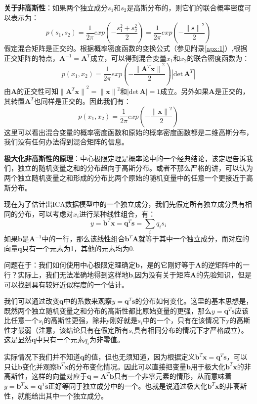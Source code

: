 \textbf{关于非高斯性}：如果两个独立成分$s_1$和$s_2$是高斯分布的，则它们的联合概率密度可以表示为：
\begin{equation}
p(s_1,s_2)
=\frac{1}{2\pi}exp(-\frac{s_1^2+s_2^2}{2})
=\frac{1}{2\pi}exp(-\frac{{\lVert \mathbf{s} \rVert}^2}{2})
\end{equation}
假定混合矩阵是正交的。根据概率密度函数的变换公式（参见附录\ref{apx:1}）,根据正交矩阵的特点，$\textbf{A}^{-1}=\textbf{A}^T$成立，可以得到混合变量$x_1$和$x_2$的联合密度函数为：
\begin{equation}
p(x_1,x_2)
=\frac{1}{2\pi}exp(-\frac{{\lVert \mathbf{A}^T\mathbf{x} \rVert}^2}{2})|\text{det}\,\mathbf{A}^T|    
\end{equation}
由$\mathbf{A}$的正交性可知${\lVert \mathbf{A}^T\mathbf{x} \rVert}^2={\lVert \mathbf{x} \rVert}^2$和$|\text{det}\,\mathbf{A}|=1$成立。另外如果$\textbf{A}$是正交的，其转置$\textbf{A}^T$也同样是正交的。因此我们有：
\begin{equation}
p(x_1,x_2)
=\frac{1}{2\pi}exp(-\frac{{\lVert \mathbf{x} \rVert}^2}{2})
\end{equation}
这里可以看出混合变量的概率密度函数和原始的概率密度函数都是二维高斯分布，我们没有任何办法得到混合矩阵的信息。

\textbf{极大化非高斯性的原理}：中心极限定理是概率论中的一个经典结论，该定理告诉我们，独立的随机变量之和的分布趋向于高斯分布。或者不那么严格的讲，可以认为两个独立随机变量之和形成的分布比两个原始的随机变量中的任意一个更接近于高斯分布。

现在为了估计出ICA数据模型中的一个独立成分，我们先假定所有独立成分具有相同的分布，可以考虑对$x_i$进行某种线性组合，有：
\begin{equation}
    y=\mathbf{b}^T\mathbf{x}=\mathbf{q}^T\mathbf{s}=\sum_{i}q_is_i
\end{equation}
如果$\mathbf{b}$是$\mathbf{A}^{-1}$中的一行，那么该线性组合$\mathbf{b}^T\mathbf{A}$就等于其中一个独立成分，而对应的向量$\mathbf{q}$只有一个元素为1，其他的元素均为0.

问题在于：我们如何使用中心极限定理确定$\mathbf{b}$，是的它刚好等于$\mathbf{A}$的逆矩阵中的一行？实际上，我们无法准确地得到这样地$\mathbf{b}$,因为没有关于矩阵$\mathbf{A}$的先验知识，但是可以找到具有较好近似程度的一个估计。

我们可以通过改变$\mathbf{q}$中的系数来观察$y=\mathbf{q}^T\mathbf{s}$的分布如何变化。这里的基本思想是，既然两个独立随机变量之和分布的高斯性都比原始变量的更强，那么$y=\mathbf{q}^T\mathbf{s}$应该比任意一个$s_i$的高斯性更强，除非y刚好就是$s_i$中的一个，只有在该情况下y的高斯性才最弱（注意，该结论只有在假定所有$s_i$具有相同分布的情况下才严格成立）。这是显然$\mathbf{q}$中只有一个元素$q_i$为非零值。

实际情况下我们并不知道$\mathbf{q}$的值，但也无须知道，因为根据定义$\mathbf{b}^T\mathbf{x}=\mathbf{q}^T\mathbf{s}$，可以只让$\mathbf{b}$变化并观察$\mathbf{b}^T\mathbf{x}$的分布变化情况。因此可以直接把变量$\mathbf{b}$用于极大化$\mathbf{b}^T\mathbf{x}$的非高斯性，这样的向量对应于$\mathbf{q}=\mathbf{A}^T\mathbf{b}$只有一个非零元素的情形，从而意味着$ y=\mathbf{b}^T\mathbf{x}=\mathbf{q}^T\mathbf{s}$正好等同于独立成分中的一个。也就是说通过极大化$\mathbf{b}^T\mathbf{x}$的非高斯性，就能给出其中一个独立成分。


